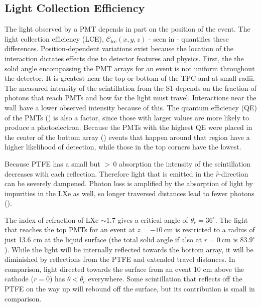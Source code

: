 \subsection{Light Collection Efficiency}
\label{subsec:det_char_lce}
The light observed by a PMT depends in part on the position of the event.  The light collection efficiency (LCE),
$\mathcal{C}_{\mathrm{lce}}(x, y, z)$ - seen in  - quantifies these differences.  Position-dependent
variations exist because the location of
the interaction dictates effects due to detector features and physics.  First, the the solid angle encompassing the PMT arrays
for an event is not uniform
throughout the detector.  It is greatest near the top or bottom of the TPC and at small radii.  The measured intensity of the
scintillation
from the S1 depends on the fraction of photons that reach PMTs and how far the light must travel.  Interactions near the
wall have a lower observed intensity because of this.  The quantum efficiency (QE) of the PMTs () is also a
factor, since those with larger values are more likely to produce a photoelectron.  Because the PMTs with the highest QE were placed in
the
center of the bottom array () events that happen around that region have a higher likelihood of detection,
while those in the top corners have the lowest.

Because PTFE has a small but ${>}\, 0$ absorption the intensity of the scintillation decreases with each reflection.  Therefore light
that is emitted in the $\hat{r}$-direction can be severely dampened.  Photon loss is amplified by the absorption of light by
impurities in the LXe as well, so longer traversed distances lead to fewer photons ().

The index of refraction of LXe ${\sim} 1.7$
gives a critical angle of $\theta_c = 36^{\circ}$.  The light that reaches the top PMTs for an event at
$z = -10\ \mathrm{cm}$ is restricted to a radius of just 13.6 cm at the liquid surface (the total solid angle if also at
$r = 0\ \mathrm{cm}$ is $83.9^{\circ}$).  While the light will be internally reflected towards the bottom array, it will
be diminished by reflections from the PTFE and extended travel distances. In comparison, light
directed towards the surface from an event 10 cm above the cathode ($r = 0$)
has $\theta < \theta_c$ everywhere.  Some scintillation that reflects off the PTFE on the way up will rebound off the surface, but its
contribution is small in comparison.

